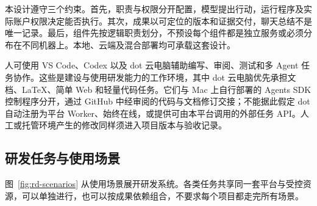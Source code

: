 \documentclass[11pt,a4paper]{article}
\begin{document}
本设计遵守三个约束。首先，职责与权限分开配置，模型提出行动，运行程序及实际账户权限决定能否执行。其次，成果以可定位的版本和证据交付，聊天总结不是唯一记录。最后，组件先按逻辑职责划分，不预设每个组件都是独立服务或必须分布在不同机器上。本地、云端及混合部署均可承载这套设计。

人可使用 VS Code、Codex 以及 dot 云电脑辅助编写、审阅、测试和多 Agent 任务协作。这些是建设与使用研发能力的工作环境，其中 dot 云电脑优先承担文档、LaTeX、简单 Web 和轻量代码任务。它们与 Mac 上自行部署的 Agents SDK 控制程序分开，通过 GitHub 中经审阅的代码与文档修订交接；不能据此假定 dot 自动注册为平台 Worker、始终在线，或提供可由本平台调用的外部任务 API。人工或托管环境产生的修改同样须进入项目版本与验收记录。

\subsection{研发任务与使用场景}

图~\ref{fig:rd-scenarios} 从使用场景展开研发系统。各类任务共享同一套平台与受控资源，可以单独进行，也可以按成果依赖组合，不要求每个项目都走完所有场景。
\end{document}
